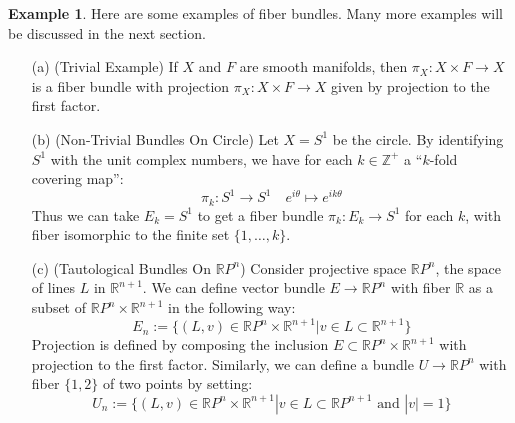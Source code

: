 \documentclass[12pt]{article}
\theoremstyle{definition}
\newtheorem{example}[theorem]{Example}
\numberwithin{equation}{section}
\newcommand{\R}{{\mathbb R}}
\newcommand{\Z}{{\mathbb Z}}
\begin{document}
\begin{example} \label{ex:bundles} Here are some examples of fiber bundles. Many more examples will be discussed in the next section.
\begin{enumerate}
	\item[(a)] (Trivial Example) If $X$ and $F$ are smooth manifolds, then $\pi_X:X \times F \to X$ is a fiber bundle with projection $\pi_X:X \times F \to X$ given by projection to the first factor.
	\item[(b)] (Non-Trivial Bundles On Circle) Let $X = S^1$ be the circle. By identifying $S^1$ with the unit complex numbers, we have for each $k \in \Z^+$ a ``$k$-fold covering map'':
	\[
	\pi_k:S^1 \to S^1 \quad e^{i\theta} \mapsto e^{ik\theta}
	\]
	Thus we can take $E_k = S^1$ to get a fiber bundle $\pi_k:E_k \to S^1$ for each $k$, with fiber isomorphic to the finite set $\{1,\dots,k\}$.
	\item[(c)] (Tautological Bundles On $\R P^n$) Consider projective space $\R P^n$, the space of lines $L$ in $\R^{n+1}$. We can define vector bundle $E \to \R P^n$ with fiber $\R$ as a subset of $\R P^n \times \R^{n+1}$ in the following way:
	\[
	E_n := \{(L,v) \in \R P^n \times \R^{n+1}| v \in L \subset \R^{n+1}\}
	\]
	Projection is defined by composing the inclusion $E \subset \R P^n \times \R^{n+1}$ with projection to the first factor. Similarly, we can define a bundle $U \to \R P^n$ with fiber $\{1,2\}$ of two points by setting:
	\[
	U_n := \{(L,v) \in \R P^n \times \R^{n+1}| v \in L \subset \R P^{n+1} \text{ and }|v| = 1\}
	\]
\end{enumerate}
\end{example}
\end{document}
